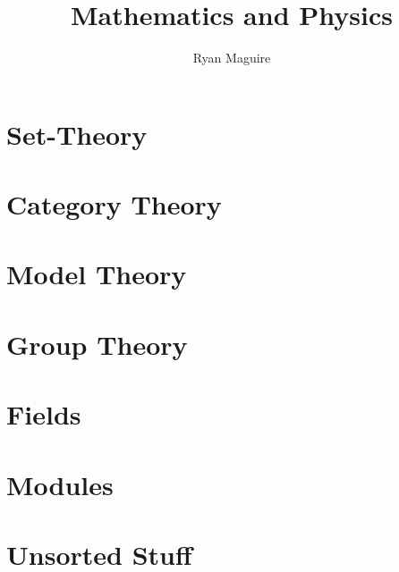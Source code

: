 \documentclass[oneside]{book}                                                  %
\title{Mathematics and Physics}                                                %
\author{Ryan Maguire}                                                          %
\date{\vspace{-5ex}}                                                           %
\newcommand*{\TOPPATH}{books}
\newcommand*{\PATH}{\TOPPATH}
\newcounter{endpage}
\begin{document}
    \maketitle
    \tableofcontents
    \listoffigures
    \listoftables
    \clearpage
        \part{Set-Theory}
            \renewcommand{\PATH}{\TOPPATH/Foundations/ZFC}
            
        \part{Category Theory}
            \renewcommand{\PATH}{\TOPPATH/Foundations/Category_Theory}
            
        \part{Model Theory}
            \renewcommand{\PATH}{\TOPPATH/Foundations/Model_Theory}
            
    \clearpage

    \setcounter{endpage}{\thepage}
        \setcounter{page}{\value{endpage}}
        \part{Group Theory}
            \renewcommand{\PATH}{\TOPPATH/Algebra/Group_Theory}
            
        \part{Fields}
            \renewcommand{\PATH}{\TOPPATH/Algebra/Fields}
            
        \part{Modules}
            \renewcommand{\PATH}{\TOPPATH/Algebra/Modules}
            
        \part{Unsorted Stuff}
            
            
\end{document}
